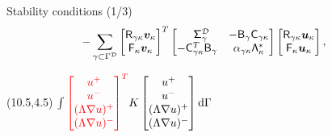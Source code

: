 \documentclass{beamer}
\begin{document}
\begin{frame} {Stability conditions (1/3)}
\begin{equation*}
\begin{aligned}
    -& \sum_{\gamma \subset \Gamma^{\fnc{D}}}
    \begin{bmatrix} \Rgk \Vkp \\ \Gk \Vkp \end{bmatrix}^{T}
    \setlength{\arraycolsep}{5pt}
    \begin{bmatrix} \phnt{-}\Sig_{\gamma}^{\fnc{D}} & -\Bg \Cgk \\
    -\Cgk^T \Bg & \alpha_{\gamma \kappa}\Lam_{\kappa}^{*} \end{bmatrix}
    \begin{bmatrix} \Rgk \Ukp \\ \Gk \Ukp \end{bmatrix},
    \end{aligned}
    \end{equation*}
    \footnotesize
    \begin{textblock}{5.55}(10.5,4.5)
        $\int 
        {\color{red}\begin{bmatrix}
            u^+ \\ u^- \\ (\Lambda\nabla u)^+ \\ (\Lambda\nabla u)^-
        \end{bmatrix}^T}
        K\begin{bmatrix}
            u^+ \\ u^- \\ (\Lambda\nabla u)^+ \\ (\Lambda\nabla u)^-
        \end{bmatrix} 
        \mathrm{d} \Gamma $
    \end{textblock}

\end{frame}
\end{document}
